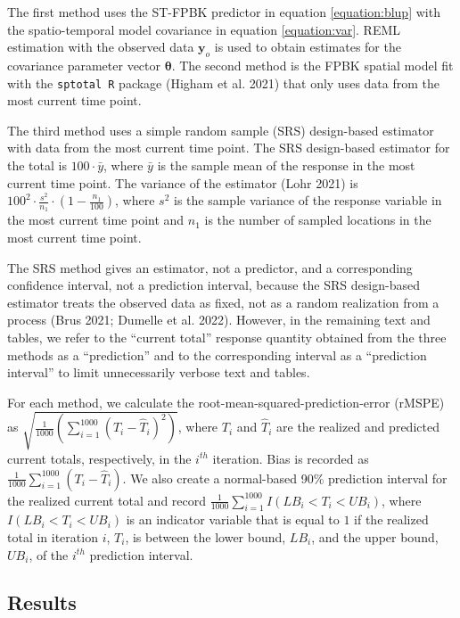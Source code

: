 \documentclass[smallextended]{svjour3}       %
\begin{document}
The first method uses the ST-FPBK predictor in equation
\ref{equation:blup} with the spatio-temporal model covariance in
equation \ref{equation:var}. REML estimation with the observed data
\(\mathbf{y}_o\) is used to obtain estimates for the covariance
parameter vector \(\bm{\theta}\). The second method is the FPBK spatial
model fit with the \texttt{sptotal R} package (Higham et al. 2021) that
only uses data from the most current time point.

The third method uses a simple random sample (SRS) design-based
estimator with data from the most current time point. The SRS
design-based estimator for the total is \(100 \cdot \bar{y}\), where
\(\bar{y}\) is the sample mean of the response in the most current time
point. The variance of the estimator (Lohr 2021) is
\(100^2 \cdot \frac{s^2}{n_1} \cdot (1 - \frac{n_1}{100})\), where
\(s^2\) is the sample variance of the response variable in the most
current time point and \(n_1\) is the number of sampled locations in the
most current time point.

The SRS method gives an estimator, not a predictor, and a corresponding
confidence interval, not a prediction interval, because the SRS
design-based estimator treats the observed data as fixed, not as a
random realization from a process (Brus 2021; Dumelle et al. 2022).
However, in the remaining text and tables, we refer to the ``current
total'' response quantity obtained from the three methods as a
``prediction'' and to the corresponding interval as a ``prediction
interval'' to limit unnecessarily verbose text and tables.

For each method, we calculate the root-mean-squared-prediction-error
(rMSPE) as
\(\sqrt{\frac{1}{1000}(\sum_{i = 1}^{1000}(T_i - \hat{T}_i)^2)}\), where
\(T_i\) and \(\hat{T}_i\) are the realized and predicted current totals,
respectively, in the \(i^{th}\) iteration. Bias is recorded as
\(\frac{1}{1000}\sum_{i = 1}^{1000}(T_i - \hat{T}_i)\). We also create a
normal-based 90\% prediction interval for the realized current total and
record \(\frac{1}{1000} \sum_{i = 1}^{1000}I(LB_i < T_i < UB_i)\), where
\(I(LB_i < T_i < UB_i)\) is an indicator variable that is equal to \(1\)
if the realized total in iteration \(i\), \(T_i\), is between the lower
bound, \(LB_i\), and the upper bound, \(UB_i\), of the \(i^{th}\)
prediction interval.

\hypertarget{results}{%
\subsection{Results}\label{results}}
\end{document}
